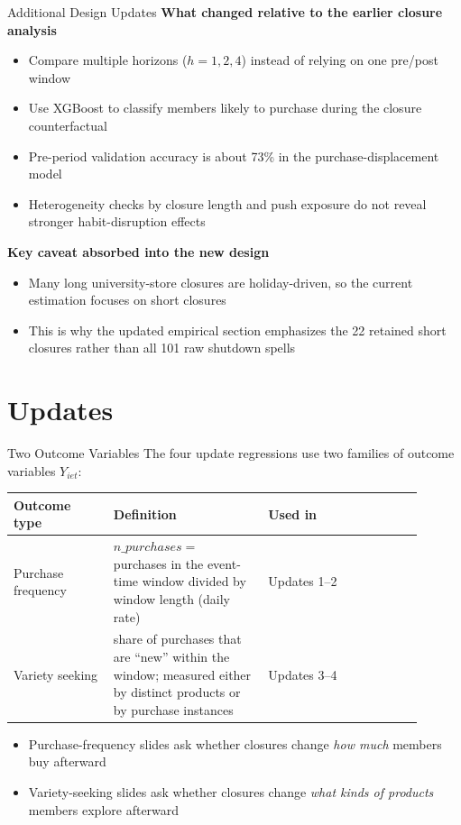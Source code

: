 \documentclass[aspectratio=169]{beamer}  %
\begin{document}
\begin{frame}{Additional Design Updates}
\small
\textbf{What changed relative to the earlier closure analysis}
\begin{itemize}
    \item Compare multiple horizons ($h=1,2,4$) instead of relying on one pre/post window
    \item Use XGBoost to classify members likely to purchase during the closure counterfactual
    \item Pre-period validation accuracy is about 73\% in the purchase-displacement model
    \item Heterogeneity checks by closure length and push exposure do not reveal stronger habit-disruption effects
\end{itemize}

\vspace{0.2cm}
\textbf{Key caveat absorbed into the new design}
\begin{itemize}
    \item Many long university-store closures are holiday-driven, so the current estimation focuses on short closures
    \item This is why the updated empirical section emphasizes the 22 retained short closures rather than all 101 raw shutdown spells
\end{itemize}
\end{frame}

\section{Updates}
\begin{frame}{Two Outcome Variables}
\small
The four update regressions use two families of outcome variables $Y_{iet}$:

\begin{table}[h]
\centering
\scriptsize
\begin{tabular}{p{0.22\linewidth} p{0.34\linewidth} p{0.34\linewidth}}
\toprule
\textbf{Outcome type} & \textbf{Definition} & \textbf{Used in} \\
\midrule
Purchase frequency &
$n\_purchases =$ purchases in the event-time window divided by window length (daily rate) &
Updates 1--2 \\
Variety seeking &
share of purchases that are ``new'' within the window; measured either by distinct products or by purchase instances &
Updates 3--4 \\
\bottomrule
\end{tabular}
\end{table}

\begin{itemize}
    \item Purchase-frequency slides ask whether closures change \emph{how much} members buy afterward
    \item Variety-seeking slides ask whether closures change \emph{what kinds of products} members explore afterward
\end{itemize}
\end{frame}
\end{document}
